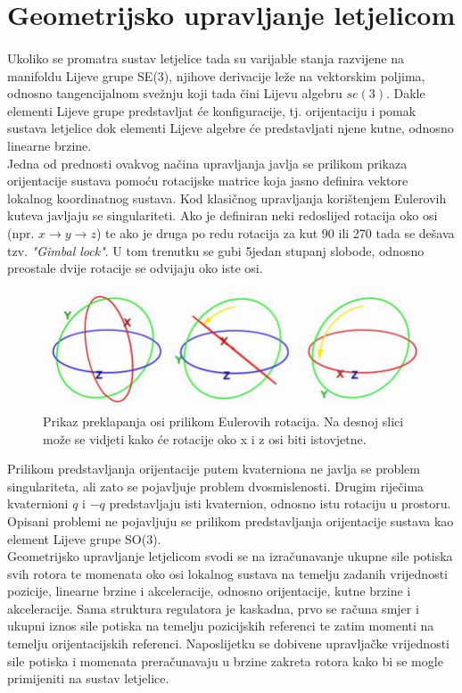 \documentclass[times, utf8, diplomski, numeric]{fer}
\begin{document}
	\newpage
	\clearpage
	
\section{Geometrijsko upravljanje letjelicom}
	
	\paragraph{}Ukoliko se promatra sustav letjelice tada su varijable stanja razvijene na manifoldu Lijeve grupe SE(3), njihove derivacije leže na vektorskim poljima, odnosno tangencijalnom svežnju koji tada čini Lijevu algebru $se(3)$. Dakle elementi Lijeve grupe predstavljat će konfiguracije, tj. orijentaciju i pomak sustava letjelice dok elementi Lijeve algebre će predstavljati njene kutne, odnosno linearne brzine. \\
	Jedna od prednosti ovakvog načina upravljanja javlja se prilikom prikaza orijentacije sustava pomoću rotacijske matrice koja jasno definira vektore lokalnog koordinatnog sustava. Kod klasičnog upravljanja korištenjem Eulerovih kuteva javljaju se singulariteti. Ako je definiran neki redoslijed rotacija oko osi (npr. $x \rightarrow y \rightarrow z$) te ako je druga po redu rotacija za kut 90 ili 270 tada se dešava tzv. \textit{"Gimbal lock"}. U tom trenutku se gubi 5jedan stupanj slobode, odnosno preostale dvije rotacije se odvijaju oko iste osi.
	
	\begin{figure}[h!]
		\includegraphics[width=\textwidth]{figures/gimbal_lock.png}
		\caption{Prikaz preklapanja osi prilikom Eulerovih rotacija. Na desnoj slici može se vidjeti kako će rotacije oko x i z osi biti istovjetne.}
	\end{figure}
	
	\noindent Prilikom predstavljanja orijentacije putem kvaterniona ne javlja se problem singulariteta, ali zato se pojavljuje problem dvosmislenosti. Drugim riječima kvaternioni $q$ i $-q$ predstavljaju isti kvaternion, odnosno istu rotaciju u prostoru. Opisani problemi ne pojavljuju se prilikom predstavljanja orijentacije sustava kao element Lijeve grupe SO(3). \\
	Geometrijsko upravljanje letjelicom svodi se na izračunavanje ukupne sile potiska svih rotora te momenata oko osi lokalnog sustava na temelju zadanih vrijednosti pozicije, linearne brzine i akceleracije, odnosno orijentacije, kutne brzine i akceleracije. Sama struktura regulatora je kaskadna, prvo se računa smjer i ukupni iznos sile potiska na temelju pozicijskih referenci te zatim momenti na temelju orijentacijskih referenci. Naposlijetku se dobivene upravljačke vrijednosti sile potiska i momenata preračunavaju u brzine zakreta rotora kako bi se mogle primijeniti na sustav letjelice.
\end{document}
